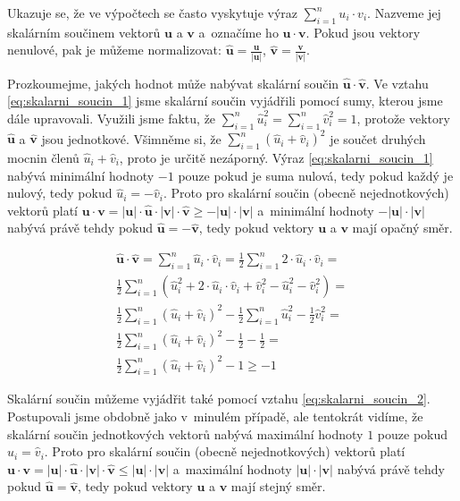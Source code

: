 \documentclass{book}
\newcommand{\vect}[1]{\boldsymbol{#1}}
\newcommand{\unitvect}[1]{\hat{\boldsymbol{#1}}}
\begin{document}
Ukazuje se, že ve výpočtech se často vyskytuje výraz  \(\sum_{i=1}^{n} u_i \cdot v_i\).
Nazveme jej skalárním součinem vektorů \(\vect{u}\) a \(\vect{v}\) a~označíme ho \(\vect{u} \cdot \vect{v}\).
Pokud jsou vektory nenulové, pak je můžeme normalizovat: \(\unitvect{u} = \frac{\vect{u}}{|\vect{u}|}\), \(\unitvect{v} = \frac{\vect{v}}{|\vect{v}|}\).

Prozkoumejme, jakých hodnot může nabývat skalární součin \(\unitvect{u} \cdot \unitvect{v}\). Ve vztahu \eqref{eq:skalarni_soucin_1} jsme skalární součin
vyjádřili pomocí sumy, kterou jsme dále upravovali. Využili jsme faktu, že \(\sum_{i=1}^{n} \hat{u}_i^2 = \sum_{i=1}^{n} \hat{v}_i^2 = 1\), protože vektory
\(\unitvect{u}\) a \(\unitvect{v}\) jsou jednotkové. Všimněme si, že \(\sum_{i=1}^{n} (\hat{u}_i + \hat{v}_i)^2\) je součet druhých mocnin členů
\(\hat{u}_i + \hat{v}_i\), proto je určitě nezáporný. Výraz \eqref{eq:skalarni_soucin_1} nabývá minimální hodnoty \(-1\) pouze pokud je suma nulová, tedy pokud každý je nulový, tedy pokud
\(\hat{u}_i = -\hat{v}_i\). Proto pro skalární součin (obecně nejednotkových) vektorů platí \(\vect{u} \cdot \vect{v} = |\vect{u}| \cdot \unitvect{u} \cdot |\vect{v}| \cdot \unitvect{v} \geq -|\vect{u}| \cdot |\vect{v}|\)
a~minimální hodnoty \(-|\vect{u}| \cdot |\vect{v}|\) nabývá právě tehdy pokud \(\unitvect{u} = -\unitvect{v}\), tedy pokud vektory \(\vect{u}\) a \(\vect{v}\) mají opačný směr.

\begin{equation}
\label{eq:skalarni_soucin_1}
\begin{split}
\unitvect{u} \cdot \unitvect{v} = \sum_{i=1}^{n} \hat{u}_i \cdot \hat{v}_i = \frac{1}{2} \sum_{i=1}^{n} 2 \cdot \hat{u}_i \cdot \hat{v}_i = \\
\frac{1}{2} \sum_{i=1}^{n} \left(\hat{u}_i^2 + 2 \cdot \hat{u}_i \cdot \hat{v}_i + \hat{v}_i^2 - \hat{u}_i^2 - \hat{v}_i^2 \right) = \\
\frac{1}{2} \sum_{i=1}^{n} (\hat{u}_i + \hat{v}_i)^2 - \frac{1}{2} \sum_{i=1}^{n} \hat{u}_i^2 - \frac{1}{2} \hat{v}_i^2 = \\
\frac{1}{2} \sum_{i=1}^{n} (\hat{u}_i + \hat{v}_i)^2 - \frac{1}{2} - \frac{1}{2} =  \\
\frac{1}{2} \sum_{i=1}^{n} (\hat{u}_i + \hat{v}_i)^2 - 1 \geq -1
\end{split}
\end{equation}

Skalární součin můžeme vyjádřit také pomocí vztahu \eqref{eq:skalarni_soucin_2}. Postupovali jsme obdobně jako v~minulém případě, ale tentokrát
vidíme, že skalární součin jednotkových vektorů nabývá maximální hodnoty \(1\) pouze pokud \(\hat{u}_i = \hat{v}_i\). Proto pro skalární součin (obecně nejednotkových) vektorů platí \(\vect{u} \cdot \vect{v} = |\vect{u}| \cdot \unitvect{u} \cdot |\vect{v}| \cdot \unitvect{v} \leq |\vect{u}| \cdot |\vect{v}|\)
a~maximální hodnoty \(|\vect{u}| \cdot |\vect{v}|\) nabývá právě tehdy pokud \(\unitvect{u} = \unitvect{v}\), tedy pokud vektory \(\vect{u}\) a \(\vect{v}\) mají stejný směr.
\end{document}
